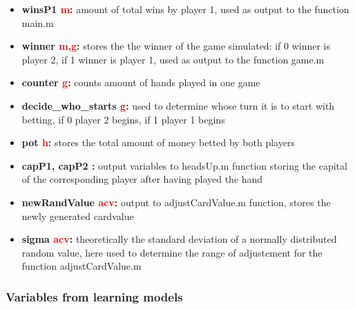 \documentclass[11pt]{article}
\begin{document}
\begin{itemize}
\item	\textbf{winsP1 \textcolor{red}{m}:} amount of total wins by player 1, used as output to the function main.m  \\

\item	\textbf{winner \textcolor{red}{m,g}:} stores the the winner of the game simulated: if 0 winner is player 2, if 1 winner is player 1, used as output to the function game.m\\

\item	\textbf{counter \textcolor{red}{g}:} counts amount of hands played in one game \\

\item	\textbf{decide\_who\_starts \textcolor{red}{g}:} used to determine whose turn it is to start with betting, if 0 player 2 begins, if 1 player 1 begins  \\

\item	\textbf{pot \textcolor{red}{h}:}  stores the total amount of money betted by both players\\

\item	\textbf{capP1, capP2 \textcolor{red}{}:} output variables to headsUp.m function storing the capital of the corresponding player after having played the hand\\

\item	\textbf{newRandValue \textcolor{red}{acv}:} output to adjustCardValue.m function, stores the newly generated cardvalue  \\

\item	\textbf{sigma \textcolor{red}{acv}:} theoretically the standard deviation of a normally distributed random value, here used to determine the range of adjustement for the function adjustCardValue.m \\

\end{itemize}

\subsubsection{Variables from learning models}
\end{document}
